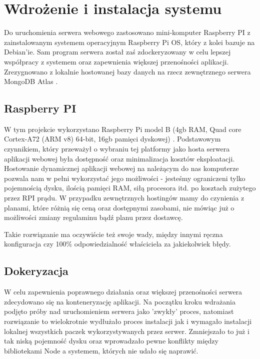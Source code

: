 

\section{Wdrożenie i instalacja systemu}

 
Do uruchomienia serwera webowego zastosowano mini-komputer Raspberry PI z zainstalowanym systemem operacyjnym Raspberry Pi OS, który
z kolei bazuje na Debian'ie. Sam program serwera został zaś zdockeryzowany w celu lepszej współpracy z systemem oraz zapewnienia większej przenośności
aplikacji. Zrezygnowano z lokalnie hostowanej bazy danych na rzecz zewnętrznego serwera MongoDB Atlas \cite{atlas}.

\subsection{Raspberry PI}
W tym projekcie wykorzystano Raspberry Pi model B (4gb RAM, Quad core Cortex-A72 (ARM v8) 64-bit, 16gb pamięci dyskowej) \cite{raspberry}.
Podstawowym czynnikiem, który przeważył o wybraniu tej platformy jako hosta serwera aplikacji webowej była dostępność oraz minimalizacja kosztów eksploatacji.
Hostowanie dynamicznej aplikacji webowej na należącym do nas komputerze pozwala nam w pełni wykorzystać jego możliwości - jesteśmy ograniczeni tylko
pojemnością dysku, ilością pamięci RAM, siłą procesora itd. po kosztach zużytego przez RPI prądu. W przypadku zewnętrznych hostingów mamy do czynienia z
planami, które różnią się ceną oraz dostępnymi zasobami, nie mówiąc już o możliwości zmiany regulaminu bądź planu przez dostawcę.

Takie rozwiązanie ma oczywiście też swoje wady, między innymi ręczna konfiguracja czy 100\% odpowiedzialność właściciela za jakiekolwiek błędy.

\subsection{Dokeryzacja}
W celu zapewnienia poprawnego działania oraz większej przenośności serwera zdecydowano się na konteneryzację aplikacji. Na początku kroku wdrażania podjęto próby 
nad uruchomieniem serwera jako 'zwykły' proces, natomiast rozwiązanie to wielokrotnie wydłużało proces instalacji jak i wymagało instalacji lokalnej wszystkich
paczek wykorzystywanych przez serwer. Zmniejszało to już i tak niską pojemność dysku oraz wprowadzało pewne konflikty między bibliotekami Node a systemem, których
nie udało się naprawić.


